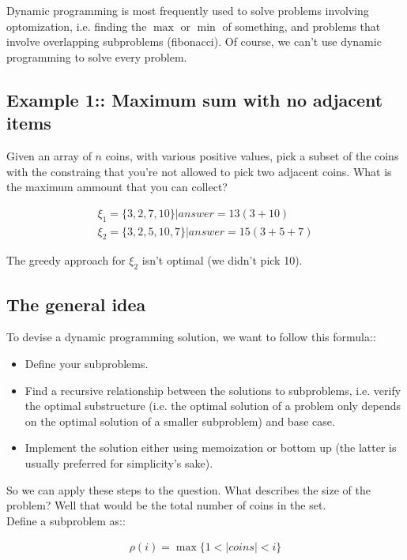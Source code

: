 \documentclass[12pt]{book}
\begin{document}
Dynamic programming is most frequently used to solve problems involving optomization, i.e. finding the $\max$ or $\min$ of something, and problems that involve overlapping subproblems (fibonacci). Of course, we can't use dynamic programming to solve every problem.

\subsection*{Example 1:: Maximum sum with no adjacent items}


Given an array of $n$ coins, with various positive values, pick a subset of the coins with the constraing that you're not allowed to pick two adjacent coins. What is the maximum ammount that you can collect?

\begin{align*}
   \xi_1=\{3,2,7,10\}|answer=13 (3+10)\\
   \xi_2=\{3,2,5,10,7\}|answer=15(3+5+7)
\end{align*}

The greedy approach for $\xi_2$ isn't optimal (we didn't pick 10).

\subsection*{The general idea}
To devise a dynamic programming solution, we want to follow this formula::

\begin{itemize}
    \item Define your subproblems.
    \item Find a recursive relationship between the solutions to subproblems, i.e. verify the optimal substructure (i.e. the optimal solution of a problem only depends on the optimal solution of a smaller subproblem) and base case.
    \item Implement the solution either using memoization or bottom up (the latter is usually preferred for simplicity's sake).
\end{itemize}

So we can apply these steps to the question. What describes the size of the problem? Well that would be the total number of coins in the set.\\

Define a subproblem as::

\begin{align*}
    \rho(i)=\max\{1<|coins|<i\}
\end{align*}
\end{document}
